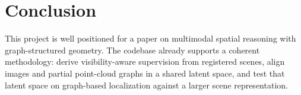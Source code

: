 \section{Conclusion}

This project is well positioned for a paper on multimodal spatial reasoning with graph-structured geometry. The codebase already supports a coherent methodology: derive visibility-aware supervision from registered scenes, align images and partial point-cloud graphs in a shared latent space, and test that latent space on graph-based localization against a larger scene representation.
